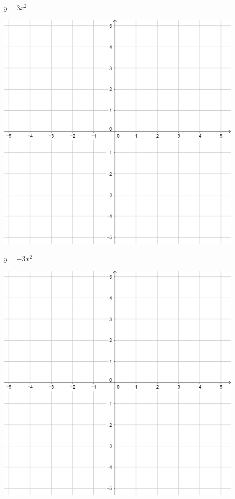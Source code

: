 \documentclass[a4paper]{oblivoir}
\begin{document}
\clearpage
\begin{minipage}{0.45\textwidth}\centering
\(y=3x^2\)
\par\bigskip\includegraphics[width=0.9\textwidth]{55}
\end{minipage}
\begin{minipage}{0.45\textwidth}\centering
\(y=-3x^2\)
\par\bigskip\includegraphics[width=0.9\textwidth]{55}
\end{minipage}\bigskip\bigskip\par
\end{document}
